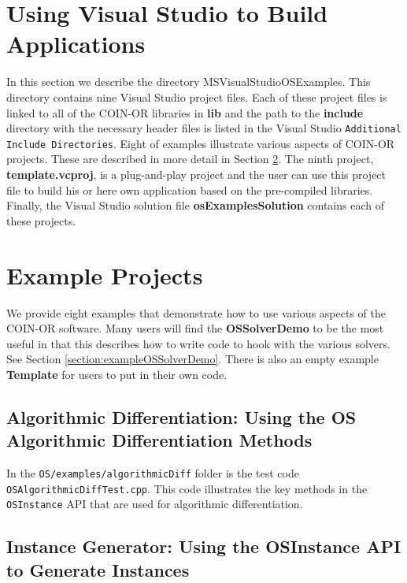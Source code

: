 \documentclass[11pt]{article}
\renewcommand{\_}{{\char"5F}}
\renewcommand{\{}{{\char"7B}}
\renewcommand{\}}{{\char"7D}}
\renewcommand{\^}{{\char"0D}}
\renewcommand{\'}{{\char"0D}}
\begin{document}
\section{Using Visual Studio to Build Applications}\label{section:visualstudio} 
In this section we describe the directory MSVisualStudioOSExamples. 
This directory contains nine Visual Studio project files.  Each of these project files is linked 
to all of the COIN-OR libraries in {\bf lib} and the path to the {\bf include} directory with 
the necessary header files is listed in the Visual Studio {\tt Additional Include Directories}. 
Eight of examples illustrate various aspects of COIN-OR projects.  These are described in more detail in Section \ref{section:examples}. The ninth project,  {\bf  template.vcproj}, is  a plug-and-play project and the user can use this project file to build his or here own application based on the pre-compiled   libraries.  Finally, the Visual Studio solution file {\bf osExamplesSolution} contains each of these projects. 

\section{Example Projects}\label{section:examples}

We provide eight examples that demonstrate how to use various aspects of the COIN-OR  software.  
Many users will find the {\bf OSSolverDemo} to be the most useful in that this describes 
how to write code to hook with the various solvers.  See Section \ref{section:exampleOSSolverDemo}.  
There is also an empty example {\bf Template} for users to put in their own code. 

\subsection{Algorithmic Differentiation:  Using the OS Algorithmic Differentiation Methods}\label{section:cppad}

In the {\tt OS/examples/algorithmicDiff} folder is the test code {\tt OSAlgorithmicDiffTest.cpp}. This code
illustrates the key methods in the {\tt OSInstance} API that are used for
algorithmic differentiation.   


\subsection{Instance Generator: Using the OSInstance API to Generate Instances}\label{section:exampleOSInstanceGeneration}
\end{document}
